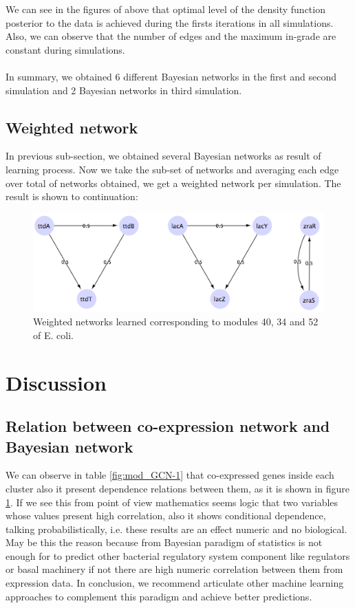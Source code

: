 \documentclass{bmcart}
\begin{document}
We can see in the figures of above that optimal level of the density function posterior to the data is achieved during the firsts iterations in all simulations. Also, we can observe that the number of edges and the maximum in-grade are constant during simulations.\\
\\
In summary, we obtained 6 different Bayesian networks in the first and second simulation and 2 Bayesian networks in third simulation.

\subsection*{Weighted network}

In previous sub-section, we obtained several Bayesian networks as result of learning process. Now we take the sub-set of networks and averaging each edge over total of networks obtained, we get a weighted network per simulation. The result is shown to continuation: 
\begin{figure}
\includegraphics[scale=2.5]{images/wn-40-34-52_Ecoli} \centering
\caption{Weighted networks learned corresponding to modules 40, 34 and 52 of E. coli.}
\label{fig:wn_40-34-52} 
\end{figure}

\section*{Discussion}

\subsection*{Relation between co-expression network and Bayesian network}

We can observe in table \ref{fig:mod_GCN-1} that co-expressed genes inside each cluster also it present dependence relations between them, as it is shown in figure \ref{fig:wn_40-34-52}. If we see this from point of view mathematics seems logic that two variables whose values present high correlation, also it shows conditional dependence, talking probabilistically, i.e. these results are an effect numeric and no biological. May be this the reason because from Bayesian paradigm of statistics is not enough for to predict other bacterial regulatory system component like regulators or basal machinery if not there are high numeric correlation between them from expression data. In conclusion, we recommend articulate other machine learning approaches to complement this paradigm and achieve better predictions. 
\end{document}
